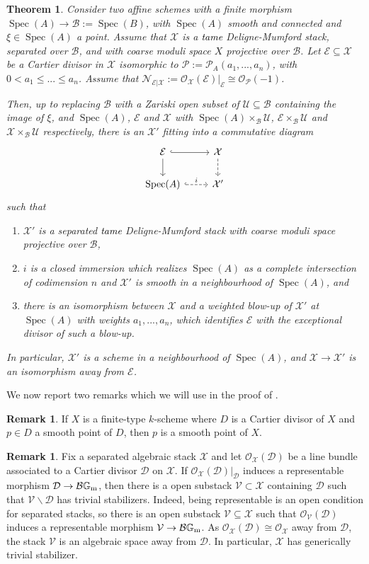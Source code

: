 \documentclass{amsart}
\newcommand{\bG}{\mathbb{G}}
\newcommand{\cB}{\mathcal{B}}
\newcommand{\cD}{\mathcal{D}}
\newcommand{\cE}{\mathcal{E}}
\newcommand{\cN}{\mathcal{N}}
\newcommand{\cO}{\mathcal{O}}
\newcommand{\cP}{\mathcal{P}}
\newcommand{\cU}{\mathcal{U}}
\newcommand{\cV}{\mathcal{V}}
\newcommand{\cX}{\mathcal{X}}
\newcommand{\spec}{\operatorname{Spec}}
\newcommand{\Gm}{\bG_{{\rm m}}}
\newtheorem{Teo}[theorem]{Theorem}
\theoremstyle{definition}
\newtheorem{Remark}[theorem]{Remark}
\begin{document}
\begin{Teo}\label{thm_affine_contraction} Consider two affine schemes with a finite morphism $\spec(A)\to \cB:=\spec(B)$, with $\spec(A)$ smooth and connected and $\xi\in \spec(A)$ a point.
Assume that $\cX$ is a \textcolor{black}{tame} Deligne-Mumford stack, separated over $\cB$, and with coarse moduli space $X$ projective over $\cB$. Let $\cE\subseteq \cX$ be a Cartier divisor in $\cX$ isomorphic to $\cP:=\cP_A(a_1,...,a_n)$, with $0<a_1\le ...\le a_n$. Assume that $\cN_{\cE\vert\cX}:=\cO_\cX(\cE)|_\cE\cong \cO_{\cP}(-1)$.

Then, up to replacing $\cB$ with a Zariski open subset of $\cU\subseteq \cB$ containing the image of $\xi$, and $\spec(A)$, $\cE$ and $\cX$ with $\spec(A)\times_\cB \cU$, $\cE\times_\cB \cU$ and $\cX\times_\cB \cU$ respectively, there is an $\cX'$ fitting into a commutative diagram
 $$ 
    \begin{tikzcd}
    \cE \arrow[d] \arrow[r, hook] & \cX \arrow[d, dashed] \\
    \spec(A) \arrow[r, dashed, "i", hook]   & \cX'                  
    \end{tikzcd}
    $$
    such that
\begin{enumerate}
    \item $\cX'$ is a separated \textcolor{black}{tame} Deligne-Mumford stack with coarse moduli space projective over $\cB$,
    \item $i$ is a closed immersion which realizes $\spec(A)$ as a complete intersection of codimension $n$ and $\cX'$ is smooth in a neighbourhood of $\spec(A)$, and 
    \item there is an isomorphism between $\cX$ and a weighted blow-up of $\cX'$ at $\spec(A)$
    with weights $a_1,...,a_n$, which identifies $\cE$ with the exceptional divisor of such a blow-up.
\end{enumerate}
In particular, $\cX'$ is a scheme in a neighbourhood of $\spec(A)$, and $\cX\to \cX'$ is an isomorphism away from $\cE$.
\end{Teo}
We now report two remarks which we will use in the proof of .
\begin{Remark}\label{rmk_sm_cartier_on_smooth}
 If $X$ is a finite-type $k$-scheme where $D$ is a Cartier divisor of $X$ and $p\in D$ a smooth point of $D$, then $p$ is a smooth point of $X$. 
 \end{Remark}
\begin{Remark}\label{remark_cX_trivial_gen_stab}
Fix a separated algebraic stack $\cX$ and let $\cO_\cX(\cD)$ be a line bundle associated to a Cartier divisor $\cD$ on $\cX$. If $\cO_\cX(\cD)|_\cD$ induces a representable morphism $\cD\to \cB\Gm$, then there is a open substack $\cV \subset \cX$ containing $\cD$ such that $\cV\smallsetminus \cD$ has trivial stabilizers.
Indeed, being representable is an open condition for separated stacks, so there is an open substack $\cV\subseteq \cX$ such that $\cO_\cV(\cD)$ induces a representable morphism $\cV\to \cB\Gm$. As $\cO_{\cX}(\cD)\cong \cO_\cX$ away from $\cD$, the stack $\cV$ is an algebraic space away from $\cD$. In particular, $\cX$ has generically trivial stabilizer. 
\end{Remark}
\end{document}
